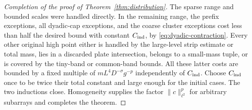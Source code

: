 \begin{proof}[Completion of the proof of Theorem~\ref{thm:distribution}]
The sparse range and bounded scales were handled directly.  In the
remaining range, the prefix exceptions, all dyadic-cap exceptions, and
the coarse cluster exceptions cost less than half the desired bound
with constant $C_{\rm ind}$, by
\eqref{eq:dyadic-contraction}.  Every other original high point either
is handled by the large-level strip estimate or total mass, lies in a
discarded plate intersection, belongs to a small-mass tuple, or is
covered by the tiny-band or common-band bounds.  All these latter costs
are bounded by a fixed multiple of $mL^4D^{-\sigma}g^{-p}$ independently
of $C_{\rm ind}$.  Choose $C_{\rm ind}$ once to be twice their total
constant and large enough for the initial cases.  The two inductions
close.  Homogeneity supplies the factor $\|c\|_{\ell^2}^p$ for arbitrary
subarrays and completes the theorem.
\end{proof}
